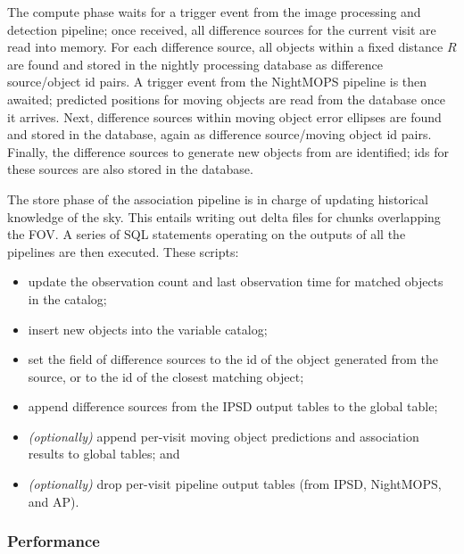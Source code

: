 The compute phase waits for a trigger event from the image processing and
detection pipeline; once received, all difference sources for the current
visit are read into memory. For each difference source, all objects within a
fixed distance $R$ are found and stored in the nightly processing database as
difference source/object id pairs. A trigger event from the NightMOPS
pipeline is then awaited; predicted positions for moving objects are read from
the database once it arrives. Next, difference sources within moving object
error ellipses are found and stored in the database, again as difference
source/moving object id pairs. Finally, the difference sources to generate new
objects from are identified; ids for these sources are also stored in the database.

The store phase of the association pipeline is in charge of updating
historical knowledge of the sky. This entails writing out delta files for
chunks overlapping the FOV. A series of SQL statements operating on the
outputs of all the pipelines are then executed. These scripts:

\begin{itemize}
\item update the observation count and last observation time for matched
      objects in the  catalog;

\item insert new objects into the variable  catalog;

\item set the  field of difference sources to the id of the
      object generated from the source, or to the id of the closest matching
      object;

\item append difference sources from the IPSD output tables to the global
       table;

\item \emph{(optionally)} append per-visit moving object predictions and
      association results to global tables; and

\item \emph{(optionally)} drop per-visit pipeline output tables (from IPSD,
      NightMOPS, and AP).
\end{itemize}

\subsubsection{Performance}

